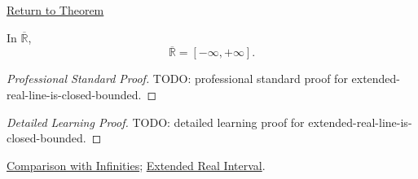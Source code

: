 \newpage
{}
\label{prf:extended-real-line-is-closed-bounded}
\begin{remark*}[Return]
\hyperref[thm:extended-real-line-is-closed-bounded]{Return to Theorem}
\end{remark*}
\begin{theorem*}
In $\overline{\mathbb{R}}$,
\[
\overline{\mathbb{R}}=[-\infty,+\infty].
\]
\end{theorem*}
\begin{proof}[Professional Standard Proof]
\LRAProofBodyStart
TODO: professional standard proof for extended-real-line-is-closed-bounded.
\end{proof}
\begin{proof}[Detailed Learning Proof]
\LRAProofBodyStart
TODO: detailed learning proof for extended-real-line-is-closed-bounded.
\end{proof}
\begin{remark*}
\end{remark*}
\begin{dependencies}
\hyperref[thm:comparison-with-infinities]{Comparison with Infinities};
\hyperref[def:extended-real-interval]{Extended Real Interval}.
\end{dependencies}
\clearpage
